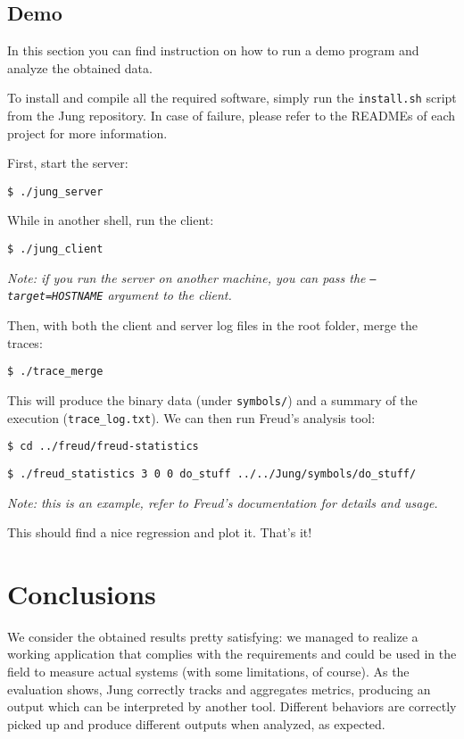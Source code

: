     \section{Demo}

        In this section you can find instruction on how to run a demo program and analyze the obtained data.

        To install and compile all the required software, simply run the \texttt{install.sh} script from the Jung repository.
        In case of failure, please refer to the READMEs of each project for more information.

        First, start the server:

        \texttt{\$ ./jung\_server}
        
        While in another shell, run the client:
        
        \texttt{\$ ./jung\_client}

        \textit{Note: if you run the server on another machine, you can pass the \texttt{---target=HOSTNAME}
        argument to the client.}

        Then, with both the client and server log files in the root folder, merge the traces:

        \texttt{\$ ./trace\_merge}

        This will produce the binary data (under \texttt{symbols/}) and a summary of the execution
        (\texttt{trace\_log.txt}).
        We can then run Freud's analysis tool:

        \texttt{\$ cd ../freud/freud-statistics}

        \texttt{\$ ./freud\_statistics 3 0 0 do\_stuff ../../Jung/symbols/do\_stuff/}
        
        \textit{Note: this is an example, refer to Freud's documentation for details and usage.}

        This should find a nice regression and plot it. That's it!


\chapter{Conclusions}


    We consider the obtained results pretty satisfying: we managed to realize a working application
    that complies with the requirements and could be used in the field to measure actual systems
    (with some limitations, of course). As the evaluation shows, Jung correctly tracks and aggregates
    metrics, producing an output which can be interpreted by another tool. Different behaviors are
    correctly picked up and produce different outputs when analyzed, as expected.
    
